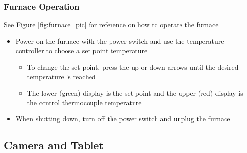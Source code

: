 \documentclass[letterpaper,11pt]{article}
\begin{document}
\subsubsection{Furnace Operation}
See Figure \ref{fig:furnace_pic} for reference on how to operate the furnace
      \begin{itemize}
      \item Power on the furnace with the power switch and use the temperature
            controller to choose a set point temperature
        \begin{itemize}
            \item To change the set point, press the up or down     arrows until 
                the desired temperature is reached
            \item The lower (green) display is the set point and     the upper 
                (red) display is the control thermocouple temperature
        \end{itemize}
        
        \item When shutting down, turn off the power switch and unplug the furnace
        \end{itemize}

        
    \subsection{Camera and Tablet} \label{sec:cam_tab}
\end{document}

